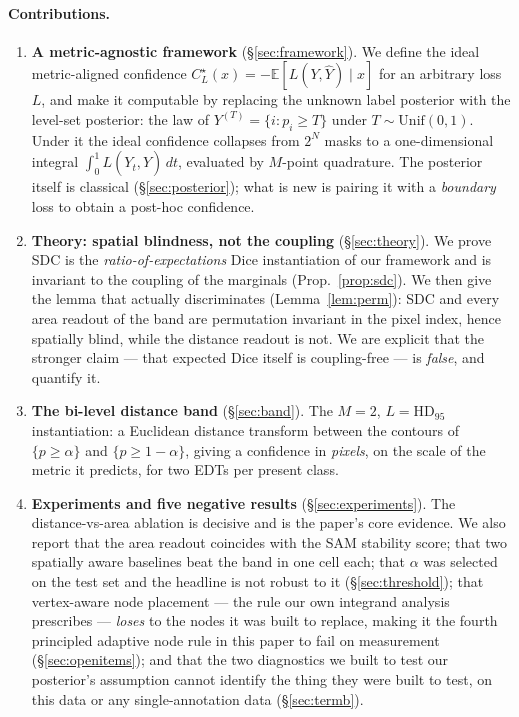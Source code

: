 \documentclass[11pt]{article}
\theoremstyle{remark}
\newcommand{\Yhat}{\widehat{Y}}
\newcommand{\HDF}{\mathrm{HD}_{95}}
\newcommand{\Ex}{\mathbb{E}}
\begin{document}
\paragraph{Contributions.}
\begin{enumerate}
\item \textbf{A metric-agnostic framework} (\S\ref{sec:framework}). We define the
ideal metric-aligned confidence $C^\star_L(x) = -\Ex[L(Y,\Yhat)\mid x]$ for an
arbitrary loss $L$, and make it computable by replacing the unknown label posterior
with the level-set posterior: the law of $Y^{(T)} = \{i : p_i \ge T\}$ under
$T\sim\mathrm{Unif}(0,1)$. Under it the ideal confidence collapses from $2^N$ masks
to a one-dimensional integral $\int_0^1 L(Y_t,\Yhat)\,dt$, evaluated by $M$-point
quadrature. The posterior itself is classical (\S\ref{sec:posterior}); what is new
is pairing it with a \emph{boundary} loss to obtain a post-hoc confidence.

\item \textbf{Theory: spatial blindness, not the coupling}
(\S\ref{sec:theory}). We prove SDC is the \emph{ratio-of-expectations} Dice
instantiation of our framework and is invariant to the coupling of the marginals
(Prop.~\ref{prop:sdc}). We then give the lemma that actually discriminates
(Lemma~\ref{lem:perm}): SDC and every area readout of the band are permutation
invariant in the pixel index, hence spatially blind, while the distance readout is
not. We are explicit that the stronger claim --- that expected Dice itself is
coupling-free --- is \emph{false}, and quantify it.

\item \textbf{The bi-level distance band} (\S\ref{sec:band}). The $M=2$, $L=\HDF$
instantiation: a Euclidean distance transform between the contours of
$\{p\ge\alpha\}$ and $\{p\ge 1-\alpha\}$, giving a confidence in \emph{pixels}, on
the scale of the metric it predicts, for two EDTs per present class.

\item \textbf{Experiments and five negative results} (\S\ref{sec:experiments}).
The distance-vs-area ablation is decisive and is the paper's core evidence. We also
report that the area readout coincides with the SAM stability score; that two
spatially aware baselines beat the band in one cell each; that $\alpha$ was
selected on the test set and the headline is not robust to it
(\S\ref{sec:threshold}); that vertex-aware node placement --- the rule our own
integrand analysis prescribes --- \emph{loses} to the nodes it was built to replace,
making it the fourth principled adaptive node rule in this paper to fail on measurement
(\S\ref{sec:openitems}); and that the two diagnostics we built to test our posterior's
assumption cannot identify the thing they were built to test, on this data or any
single-annotation data (\S\ref{sec:termb}).


\end{enumerate}
\end{document}
